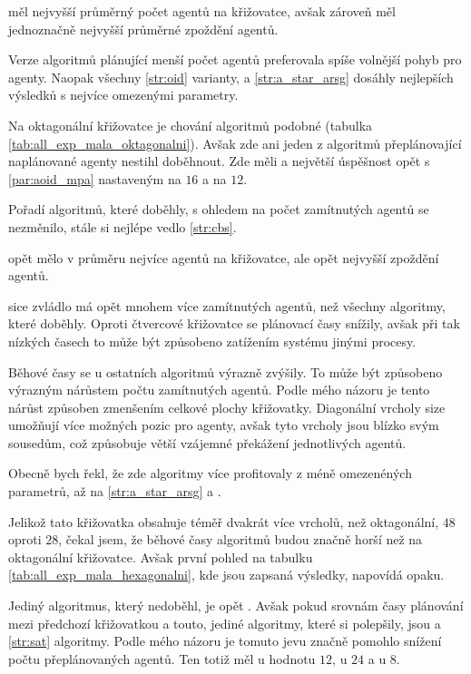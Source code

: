  měl nejvyšší průměrný počet agentů na křižovatce,
avšak zároveň měl jednoznačně nejvyšší průměrné zpoždění agentů.

Verze algoritmů plánující menší počet agentů preferovala spíše volnější pohyb pro agenty.
Naopak všechny \ref{str:oid} varianty,  a \ref{str:a_star_arsg} dosáhly nejlepších výsledků s nejvíce omezenými parametry.



Na oktagonální křižovatce je chování algoritmů podobné (tabulka \ref{tab:all_exp_mala_oktagonalni}).
Avšak zde ani jeden z algoritmů přeplánovající naplánované agenty nestihl doběhnout.
Zde měli  a 
největší úspěšnost opět s \ref{par:aoid_mpa} nastaveným na $16$ a  na $12$.

Pořadí algoritmů, které doběhly, s ohledem na počet zamítnutých agentů se nezměnilo,
stále si nejlépe vedlo \ref{str:cbs}.

 opět mělo v průměru nejvíce agentů na křižovatce, ale opět nejvyšší zpoždění agentů.

 sice zvládlo má opět mnohem více zamítnutých agentů, než všechny algoritmy, které doběhly.
Oproti čtvercové křižovatce se plánovací časy snížily,
avšak při tak nízkých časech to může být způsobeno zatížením systému jinými procesy.

Běhové časy se u ostatních algoritmů výrazně zvýšily.
To může být způsobeno výrazným nárůstem počtu zamítnutých agentů.
Podle mého názoru je tento nárůst způsoben zmenšením celkové plochy křižovatky.
Diagonální vrcholy size umožňují více možných pozic pro agenty,
avšak tyto vrcholy jsou blízko svým sousedům, což způsobuje větší vzájemné překážení jednotlivých agentů.

Obecně bych řekl, že zde algoritmy více profitovaly z méně omezenéných parametrů,
až na \ref{str:a_star_arsg} a .



Jelikož tato křižovatka obsahuje téměř dvakrát více vrcholů, než oktagonální, $48$ oproti $28$, čekal jsem,
že běhové časy algoritmů budou značně horší než na oktagonální křižovatce.
Avšak první pohled na tabulku \ref{tab:all_exp_mala_hexagonalni}, kde jsou zapsaná výsledky, napovídá opaku.

Jediný algoritmus, který nedoběhl, je opět .
Avšak pokud srovnám časy plánování mezi předchozí křižovatkou a touto, jediné algoritmy, které si polepšily,
jsou  a \ref{str:sat} algoritmy.
Podle mého názoru je tomuto jevu značně pomohlo snížení počtu přeplánovaných agentů.
Ten totiž měl u  hodnotu $12$,
u  $24$ a u  $8$.

